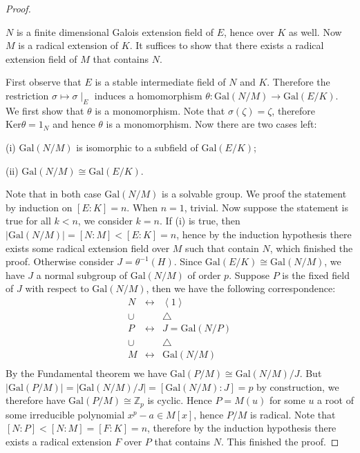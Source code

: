 \begin{proof}
\begin{center}
\begin{tikzpicture}[x=0.75pt,y=0.75pt,yscale=-1,xscale=1]
\end{tikzpicture}
\end{center}
$N$ is a finite dimensional Galois extension field of $E$, hence over $K$ as well. Now $M$ is a radical extension of $K$. It suffices to show that there exists a radical extension field of $M$ that contains $N$.\par
First observe that $E$ is a stable intermediate field of $N$ and $K$. Therefore the restriction $\sigma\mapsto\sigma\mid_E$ induces a homomorphism $\theta:\mathrm{Gal}(N/M)\to\mathrm{Gal}(E/K)$. We first show that $\theta$ is a monomorphism. Note that $\sigma(\zeta)=\zeta$, therefore $\mathrm{Ker}\theta=1_N$ and hence $\theta$ is a monomorphism. Now there are two cases left: \par
(i) $\mathrm{Gal}(N/M)$ is isomorphic to a subfield of $\mathrm{Gal}(E/K)$;\par
(ii) $\mathrm{Gal}(N/M)\cong\mathrm{Gal}(E/K)$.\par
Note that in both case $\mathrm{Gal}(N/M)$ is a solvable group. We proof the statement by induction on $[E:K]=n$. When $n=1$, trivial. Now suppose the statement is true for all $k<n$, we consider $k=n$. If (i) is true, then $|\mathrm{Gal}(N/M)|=[N:M]<[E:K]=n$, hence by the induction hypothesis there exists some radical extension field over $M$ such that contain $N$, which finished the proof. Otherwise consider $J=\theta^{-1}(H)$. Since $\mathrm{Gal}(E/K)\cong\mathrm{Gal}(N/M)$, we have $J$ a normal subgroup of $\mathrm{Gal}(N/M)$ of order $p$. Suppose $P$ is the fixed field of $J$ with respect to $\mathrm{Gal}(N/M)$, then we have the following correspondence: 
$$
\begin{matrix}
	N&		\leftrightarrow&		\left< 1 \right>\\
	\cup&		&		\bigtriangleup\\
	P&		\leftrightarrow&		J=\mathrm{Gal}\left( N/P \right)\\
	\cup&		&		\bigtriangleup\\
	M&		\leftrightarrow&		\mathrm{Gal}\left( N/M \right)\\
\end{matrix}
$$
By the Fundamental theorem we have $\mathrm{Gal}(P/M)\cong\mathrm{Gal}(N/M)/J$. But $|\mathrm{Gal}(P/M)|=|\mathrm{Gal}(N/M)/J|=[\mathrm{Gal}(N/M):J]=p$ by construction, we therefore have $\mathrm{Gal}(P/M)\cong\mathbb{Z}_p$ is cyclic. Hence $P=M(u)$ for some $u$ a root of some irreducible polynomial $x^p-a\in M[x]$, hence $P/M$ is radical. Note that $[N:P]<[N:M]=[F:K]=n$, therefore by the induction hypothesis there exists a radical extension $F$ over $P$ that contains $N$. This finished the proof.
\end{proof}
